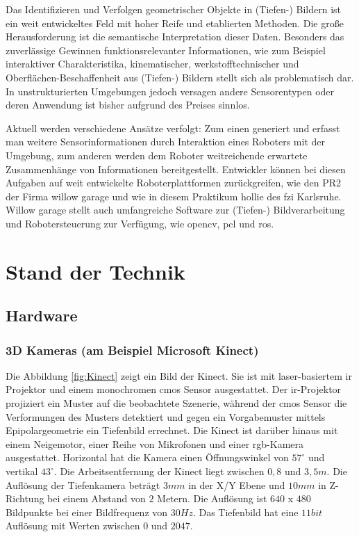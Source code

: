 Das Identifizieren und Verfolgen geometrischer Objekte in (Tiefen-) Bildern ist ein weit entwickeltes Feld mit hoher Reife und etablierten Methoden.
 Die große Herausforderung ist die semantische Interpretation dieser Daten. Besonders das zuverlässige Gewinnen funktionsrelevanter Informationen,
 wie zum Beispiel interaktiver Charakteristika, kinematischer, werkstofftechnischer und  Oberflächen-Beschaffenheit aus (Tiefen-) Bildern stellt sich
 als problematisch dar. In unstrukturierten Umgebungen jedoch versagen andere Sensorentypen oder deren Anwendung ist bisher aufgrund des Preises sinnlos.
 
Aktuell werden verschiedene Ansätze verfolgt: Zum einen generiert und erfasst man weitere Sensorinformationen durch Interaktion eines Roboters mit der Umgebung,
 zum anderen werden dem Roboter weitreichende erwartete Zusammenhänge von Informationen bereitgestellt. Entwickler können bei diesen Aufgaben auf weit entwickelte Roboterplattformen
 zurückgreifen, wie den PR2 der Firma willow garage und wie in diesem Praktikum
 \gls{hollie} des \gls{fzi} Karlsruhe. Willow garage stellt auch umfangreiche
 Software zur (Tiefen-) Bildverarbeitung und Robotersteuerung zur Verfügung,
 wie \gls{opencv}, \gls{pcl} und \gls{ros}.

\section{Stand der Technik}
\label{stand_der_technik_sec}

\subsection{Hardware}
\subsubsection{3D Kameras (am Beispiel Microsoft Kinect)}
Die Abbildung \ref{fig:Kinect} zeigt ein Bild der Kinect. Sie ist mit
 laser-basiertem \gls{ir} Projektor und einem monochromen \gls{cmos} Sensor ausgestattet.
 Der \gls{ir}-Projektor projiziert ein Muster auf die beobachtete Szenerie,
 während der \gls{cmos} Sensor die Verformungen des Musters detektiert und gegen
 ein Vorgabemuster mittels Epipolargeometrie ein Tiefenbild errechnet.
 Die Kinect ist darüber hinaus mit einem Neigemotor, einer Reihe von Mikrofonen
 und einer \gls{rgb}-Kamera ausgestattet. Horizontal hat die Kamera einen Öffnungswinkel
 von $57^\circ$ und vertikal $43^\circ$. Die Arbeitsentfernung der Kinect liegt
 zwischen $0,8$ und $3,5m$. Die Auflösung der Tiefenkamera beträgt $3mm$ in
 der X/Y Ebene und $10mm$ in Z-Richtung bei einem Abstand von $2$ Metern. Die
 Auflösung ist $640$ x $480$ Bildpunkte bei einer Bildfrequenz von $30Hz$. Das
 Tiefenbild hat eine $11bit$ Auflösung mit Werten zwischen $0$ und $2047$.

